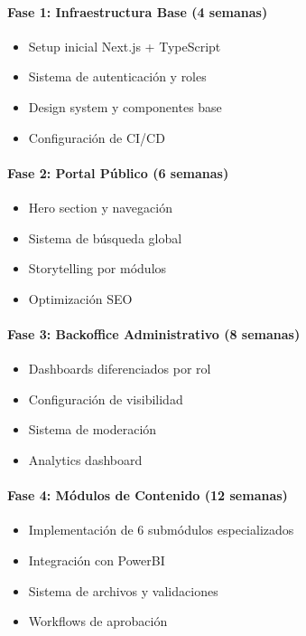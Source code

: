 \documentclass[12pt,a4paper]{article}
\begin{document}
\paragraph{Fase 1: Infraestructura Base (4 semanas)}
\begin{itemize}
    \item Setup inicial Next.js + TypeScript
    \item Sistema de autenticación y roles
    \item Design system y componentes base
    \item Configuración de CI/CD
\end{itemize}

\paragraph{Fase 2: Portal Público (6 semanas)}
\begin{itemize}
    \item Hero section y navegación
    \item Sistema de búsqueda global
    \item Storytelling por módulos
    \item Optimización SEO
\end{itemize}

\paragraph{Fase 3: Backoffice Administrativo (8 semanas)}
\begin{itemize}
    \item Dashboards diferenciados por rol
    \item Configuración de visibilidad
    \item Sistema de moderación
    \item Analytics dashboard
\end{itemize}

\paragraph{Fase 4: Módulos de Contenido (12 semanas)}
\begin{itemize}
    \item Implementación de 6 submódulos especializados
    \item Integración con PowerBI
    \item Sistema de archivos y validaciones
    \item Workflows de aprobación
\end{itemize}
\end{document}
